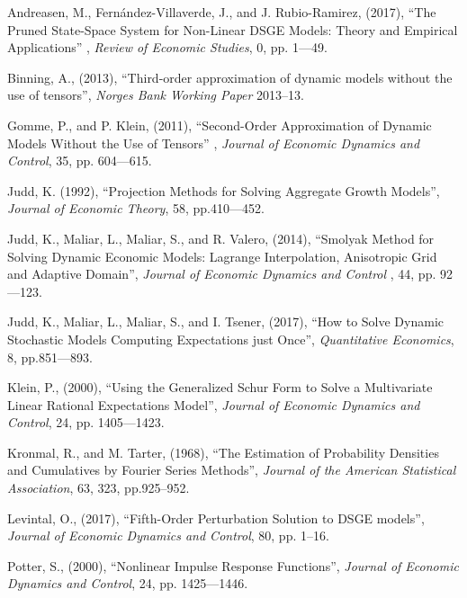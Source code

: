 \documentclass[notitlepage,11pt]{article}
\begin{document}
\begin{thebibliography}{99}
\bibitem{} Andreasen, M., Fern\'{a}ndez-Villaverde, J., and J.
Rubio-Ramirez, (2017), \textquotedblleft The Pruned State-Space System for
Non-Linear DSGE Models: Theory and Empirical Applications\textquotedblright
, \textit{Review of Economic Studies}, 0, pp. 1---49.

\bibitem{} Binning, A., (2013), \textquotedblleft Third-order approximation
of dynamic models without the use of tensors\textquotedblright , \textit{%
Norges Bank Working Paper} 2013--13.

\bibitem{} Gomme, P., and P. Klein, (2011), \textquotedblleft Second-Order
Approximation of Dynamic Models Without the Use of Tensors\textquotedblright
, \textit{Journal of Economic Dynamics and Control}, 35, pp. 604---615.

\bibitem{} Judd, K. (1992), \textquotedblleft Projection Methods for Solving
Aggregate Growth Models\textquotedblright , \textit{Journal of Economic
Theory}, 58, pp.410---452.

\bibitem{} Judd, K., Maliar, L., Maliar, S., and R. Valero, (2014),
\textquotedblleft Smolyak Method for Solving Dynamic Economic Models:
Lagrange Interpolation, Anisotropic Grid and Adaptive
Domain\textquotedblright , \textit{Journal of Economic Dynamics and Control}%
, 44, pp. 92---123.

\bibitem{} Judd, K., Maliar, L., Maliar, S., and I. Tsener, (2017),
\textquotedblleft How to Solve Dynamic Stochastic Models Computing
Expectations just Once\textquotedblright , \textit{Quantitative Economics},
8, pp.851---893.

\bibitem{} Klein, P., (2000), \textquotedblleft Using the Generalized Schur
Form to Solve a Multivariate Linear Rational Expectations
Model\textquotedblright , \textit{Journal of Economic Dynamics and Control},
24, pp. 1405---1423.

\bibitem{} Kronmal, R., and M. Tarter, (1968), \textquotedblleft The
Estimation of Probability Densities and Cumulatives by Fourier Series
Methods\textquotedblright , \textit{Journal of the American Statistical
Association}, 63, 323, pp.925--952.

\bibitem{} Levintal, O., (2017), \textquotedblleft Fifth-Order Perturbation
Solution to DSGE models\textquotedblright , \textit{Journal of Economic
Dynamics and Control}, 80, pp. 1--16.

\bibitem{} Potter, S., (2000), \textquotedblleft Nonlinear Impulse Response
Functions\textquotedblright , \textit{Journal of Economic Dynamics and
Control}, 24, pp. 1425---1446.
\end{thebibliography}
\end{document}
